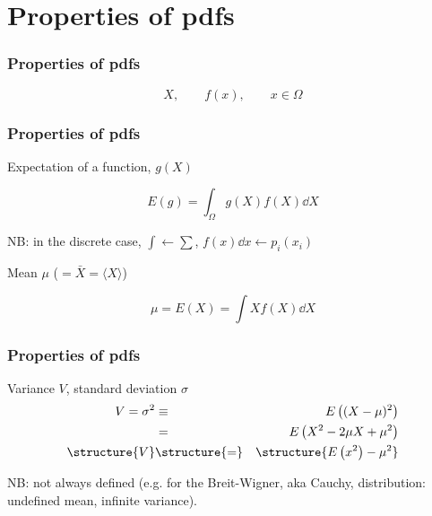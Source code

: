 \documentclass[9pt]{beamer}
\begin{document}
\section{Properties of pdfs}

\begin{frame}
 \frametitle{Properties of pdfs}
 
 $$X,\qquad f(x),\qquad x \in \Omega$$
  
\end{frame}

\begin{frame}
 \frametitle{Properties of pdfs}
 
 \begin{block}{Expectation of a function, $g(X)$}
  
  $$E(g) = \int_\Omega g(X) f(X) \dd X$$
  
  {\footnotesize NB: in the discrete case, $\int \leftarrow \sum$, $f(x) \dd x \leftarrow p_i (x_i)$ }
 \end{block}
 
 \begin{block}{Mean $\mu$ ($= \bar{X} = \langle X \rangle$)}
 
  $$\mu = E(X) = \int X f(X) \dd X$$
 \end{block}
 
 \end{frame}

\begin{frame}
 \frametitle{Properties of pdfs}

 \begin{block}{Variance $V$, standard deviation $\sigma$}
  \begin{eqnarray}
   V = \sigma^2 & \equiv & E \left( (X-\mu)^2 \right) \nonumber\\
   & = & E \left( X^2 - 2 \mu X + \mu^2\right) \nonumber\\
   \structure{V} & \structure{=} & \structure{E\left( x^2 \right) - \mu^2} \nonumber
  \end{eqnarray}

 \end{block}

 NB: not always defined (e.g. for the Breit-Wigner, aka Cauchy, distribution: undefined mean, infinite variance).

\end{frame}
\end{document}
